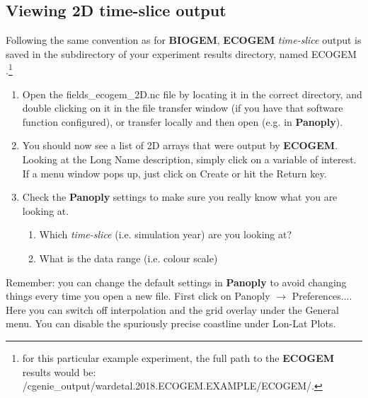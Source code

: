 \documentclass[11pt,fleqn]{book} %
\begin{document}

\subsection{Viewing 2D time-slice output} 

Following the same convention as for \textbf{BIOGEM}, \textbf{ECOGEM} \textit{time-slice} output is saved in the subdirectory of your experiment results directory, named \footnotesize\textsf{ECOGEM }\normalsize.\footnote{for this particular example experiment, the full path to the \textbf{ECOGEM} results would be: \\ \scriptsize\textsf{/cgenie\_output/wardetal.2018.ECOGEM.EXAMPLE/ECOGEM/}\normalsize.}

\begin{enumerate}[noitemsep]
\vspace{1mm}
\item Open the \textsf{\small fields\_ecogem\_2D.nc} file by locating it in the correct directory, and double clicking on it in the file transfer window (if you have that software function configured), or transfer locally and then open (e.g. in \textbf{Panoply}).
\vspace{1mm}
\item You should now see a list of 2D arrays that were output by \textbf{ECOGEM}. Looking at the \textsf{\small Long Name} description, simply click on a variable of interest. If a menu window pops up, just click on \textsf{\small Create} or hit the \textsf{\small Return} key.
\vspace{1mm}
\item Check the \textbf{Panoply} settings to make sure you really know what you are looking at.
\begin{enumerate}[noitemsep]
\item Which \textit{time-slice} (i.e. simulation year) are you looking at?
\item What is the data range (i.e. colour scale)
\end{enumerate}
\end{enumerate}
\vspace{2mm}

\noindent Remember: you can change the default settings in \textbf{Panoply} to avoid changing things every time you open a new file. First click on \textsf{\small Panoply} $\rightarrow$ \textsf{\small Preferences...}. Here you can switch off interpolation and the grid overlay under the \textsf{\small General} menu. You can disable the spuriously precise coastline under \textsf{\small Lon-Lat Plots}.
\end{document}
